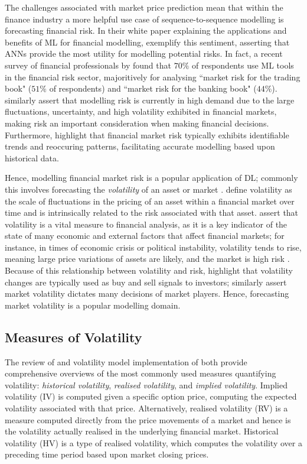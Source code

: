 \documentclass[a4paper, 11pt]{report}
\begin{document}
    The challenges associated with market price prediction mean that within the finance industry a more helpful use case of sequence-to-sequence modelling is forecasting financial risk. In their white paper explaining the applications and benefits of ML for financial modelling, \citet{laplante-2019} exemplify this sentiment, asserting that ANNs provide the most utility for modelling potential risks. In fact, a recent survey of financial professionals by \citet{chartis-2019} found that $70\%$ of respondents use ML tools in the financial risk sector, majoritively for analysing ``market risk for the trading book" ($51\%$ of respondents) and ``market risk for the banking book" ($44\%$). \citet{peng-2021} similarly assert that modelling risk is currently in high demand due to the large fluctuations, uncertainty, and high volatility exhibited in financial markets, making risk an important consideration when making financial decisions. Furthermore, \citet{mashrur-2020} highlight that financial market risk typically exhibits identifiable trends and reoccuring patterns, facilitating accurate modelling based upon historical data.

    Hence, modelling financial market risk is a popular application of DL; commonly this involves forecasting the \emph{volatility} of an asset or market \citep{peng-2021}. \citet{cavalcante-2016} define volatility as the scale of fluctuations in the pricing of an asset within a financial market over time and is intrinsically related to the risk associated with that asset. \citeauthor{cavalcante-2016} assert that volatility is a vital measure to financial analysis, as it is a key indicator of the state of many economic and external factors that affect financial markets; for instance, in times of economic crisis or political instability, volatility tends to rise, meaning large price variations of assets are likely, and the market is high risk \citep{sezer-2019}. Because of this relationship between volatility and risk, \citet{tino-2001} highlight that volatility changes are typically used as buy and sell signals to investors; \citet{ge-2022} similarly assert market volatility dictates many decisions of market players. Hence, forecasting market volatility is a popular modelling domain.

    \subsection{Measures of Volatility}

    The review of \citet{ge-2022} and volatility model implementation of \citet{tino-2001} both provide comprehensive overviews of the most commonly used measures quantifying volatility: \emph{historical volatility}, \emph{realised volatility}, and \emph{implied volatility}. Implied volatility (IV) is computed given a specific option price, computing the expected volatility associated with that price. Alternatively, realised volatility (RV) is a measure computed directly from the price movements of a market and hence is the volatility actually realised in the underlying financial market. Historical volatility (HV) is a type of realised volatility, which computes the volatility over a preceding time period based upon market closing prices.
\end{document}
